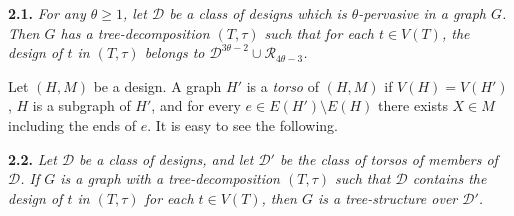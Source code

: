 \textbf{2.1.} \textit{For any $\theta \ge 1$, let $\mathscr{D}$ be a class of designs which is $\theta$-pervasive in a graph $G$. Then $G$ has a tree-decomposition $(T, \tau)$ such that for each $t \in V(T)$, the design of $t$ in $(T, \tau)$ belongs to $\mathscr{D}^{3\theta-2} \cup \mathscr{R}_{4\theta-3}$.}

Let $(H, M)$ be a design. A graph $H'$ is a \textit{torso} of $(H, M)$ if $V(H) = V(H')$, $H$ is a subgraph of $H'$, and for every $e \in E(H') \setminus E(H)$ there exists $X \in M$ including the ends of $e$. It is easy to see the following.

\textbf{2.2.} \textit{Let $\mathscr{D}$ be a class of designs, and let $\mathscr{D}'$ be the class of torsos of members of $\mathscr{D}$. If $G$ is a graph with a tree-decomposition $(T, \tau)$ such that $\mathscr{D}$ contains the design of $t$ in $(T, \tau)$ for each $t \in V(T)$, then $G$ is a tree-structure over $\mathscr{D}'$.}


